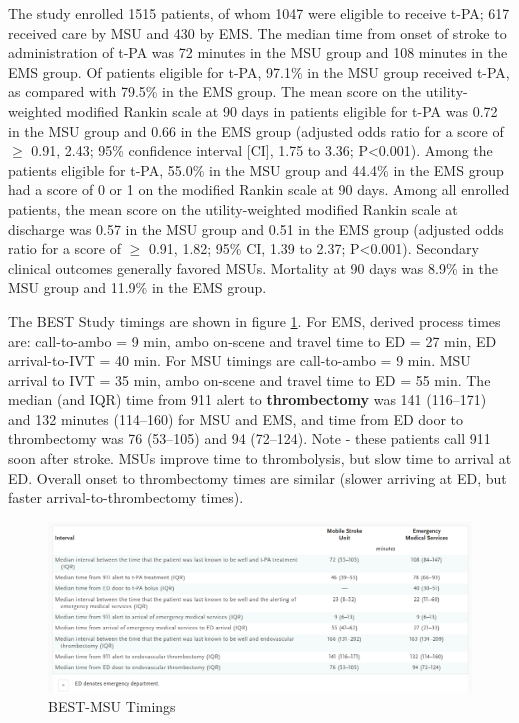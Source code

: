 The study enrolled 1515 patients, of whom 1047 were eligible to receive t-PA; 617 received care by MSU and 430 by EMS. The median time from onset of stroke to administration of t-PA was 72 minutes in the MSU group and 108 minutes in the EMS group. Of patients eligible for t-PA, 97.1\% in the MSU group received t-PA, as compared with 79.5\% in the EMS group. The mean score on the utility-weighted modified Rankin scale at 90 days in patients eligible for t-PA was 0.72 in the MSU group and 0.66 in the EMS group (adjusted odds ratio for a score of $\ge$ 0.91, 2.43; 95\% confidence interval [CI], 1.75 to 3.36; P<0.001). Among the patients eligible for t-PA, 55.0\% in the MSU group and 44.4\% in the EMS group had a score of 0 or 1 on the modified Rankin scale at 90 days. Among all enrolled patients, the mean score on the utility-weighted modified Rankin scale at discharge was 0.57 in the MSU group and 0.51 in the EMS group (adjusted odds ratio for a score of  $\ge$ 0.91, 1.82; 95\% CI, 1.39 to 2.37; P<0.001). Secondary clinical outcomes generally favored MSUs. Mortality at 90 days was 8.9\% in the MSU group and 11.9\% in the EMS group.

The BEST Study \cite{grotta_prospective_2021} timings are shown in figure \ref{fig:best_msu_timings}. For EMS, derived process times are: call-to-ambo = 9 min, ambo on-scene and travel time to ED = 27 min, ED arrival-to-IVT = 40 min. For MSU timings are call-to-ambo = 9 min. MSU arrival to IVT = 35 min, ambo on-scene and travel time to ED = 55 min. The median (and IQR) time from 911 alert to \textbf{thrombectomy} was 141 (116–171) and 132 minutes (114–160) for MSU and EMS, and  time from ED door to thrombectomy was 76 (53–105) and 94 (72–124). Note - these patients call 911 soon after stroke. MSUs improve time to thrombolysis, but slow time to arrival at ED. Overall onset to thrombectomy times are similar (slower arriving at ED, but faster arrival-to-thrombectomy times). 

\begin{figure}
    \centering
    \includegraphics[width=0.75\linewidth]{images_background/best_msu_timings.png}
    \caption{BEST-MSU Timings}
    \label{fig:best_msu_timings}
\end{figure}


